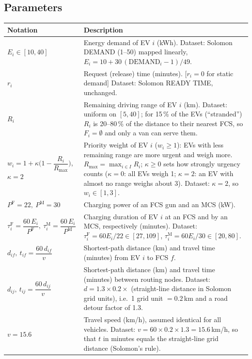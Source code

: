 \documentclass[12pt,a4paper]{article}
\begin{document}
\subsection*{Parameters}
{\small
\begin{tabularx}{\textwidth}{@{}>{\raggedright\arraybackslash}p{4.6cm}X@{}}
\toprule
\textbf{Notation} & \textbf{Description} \\
\midrule
$E_i\in[10,40]$ & Energy demand of EV $i$ (kWh). Dataset: Solomon DEMAND (1--50) mapped linearly, $E_i=10+30\,(\text{DEMAND}_i-1)/49$. \\[2pt]
$r_i$ & Request (release) time (minutes). [$r_i=0$ for static demand] Dataset: Solomon READY TIME, unchanged. \\[2pt]
$R_i$ & Remaining driving range of EV $i$ (km). Dataset: uniform on $[5,40]$; for 15\,\% of the EVs (``stranded'') $R_i$ is 20--80\,\% of the distance to their nearest FCS, so $F_i=\emptyset$ and only a van can serve them. \\[2pt]
$w_i=1+\kappa\Big(1-\dfrac{R_i}{R_{\max}}\Big)$,\newline $\kappa=2$ & Priority weight of EV $i$ ($w_i\ge1$): EVs with less remaining range are more urgent and weigh more. $R_{\max}=\max_{i\in I}R_i$; $\kappa\ge0$ sets how strongly urgency counts ($\kappa=0$: all EVs weigh 1; $\kappa=2$: an EV with almost no range weighs about 3). Dataset: $\kappa=2$, so $w_i\in[1,3]$. \\[2pt]
$P^{\mathrm F}=22,\ P^{\mathrm M}=30$ & Charging power of an FCS gun and an MCS (kW). \\[2pt]
$\tau^{\mathrm F}_i=\dfrac{60\,E_i}{P^{\mathrm F}},\ \tau^{\mathrm M}_i=\dfrac{60\,E_i}{P^{\mathrm M}}$ & Charging duration of EV $i$ at an FCS and by an MCS, respectively (minutes). Dataset: $\tau^{\mathrm F}_i=60E_i/22\in[27,109]$, $\tau^{\mathrm M}_i=60E_i/30\in[20,80]$. \\[2pt]
$d_{if},\ t_{if}=\dfrac{60\,d_{if}}{v}$ & Shortest-path distance (km) and travel time (minutes) from EV $i$ to FCS $f$. \\[2pt]
$d_{ij},\ t_{ij}=\dfrac{60\,d_{ij}}{v}$ & Shortest-path distance (km) and travel time (minutes) between routing nodes. Dataset: $d=1.3\times0.2\times$ (straight-line distance in Solomon grid units), i.e.\ 1 grid unit $=0.2$\,km and a road detour factor of 1.3. \\[2pt]
$v=15.6$ & Travel speed (km/h), assumed identical for all vehicles. Dataset: $v=60\times0.2\times1.3=15.6$\,km/h, so that $t$ in minutes equals the straight-line grid distance (Solomon's rule). \\[2pt]

\end{tabularx}}
\end{document}
